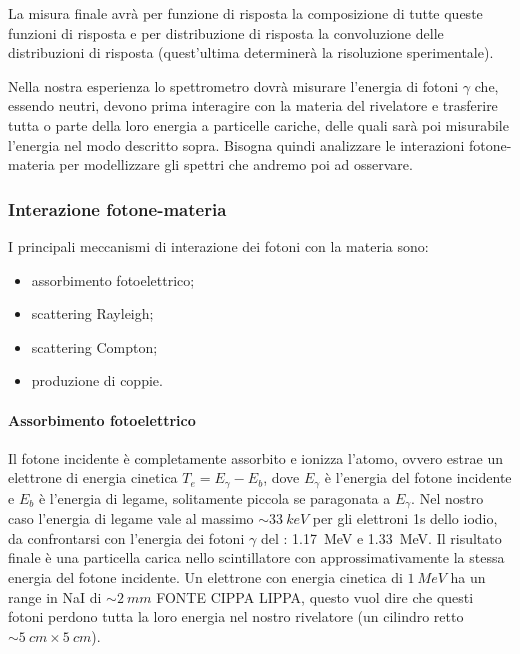 La misura finale avrà per funzione di risposta la composizione di tutte queste funzioni di risposta e per distribuzione di risposta la convoluzione delle distribuzioni di risposta (quest'ultima determinerà la risoluzione sperimentale).

Nella nostra esperienza lo spettrometro dovrà misurare l'energia di fotoni $\gamma$ che, essendo neutri, devono prima interagire con la materia del rivelatore e trasferire tutta o parte della loro energia a particelle cariche, delle quali sarà poi misurabile l'energia nel modo descritto sopra. Bisogna quindi analizzare le interazioni fotone-materia per modellizzare gli spettri che andremo poi ad osservare.

\subsubsection{Interazione fotone-materia}
I principali meccanismi di interazione dei fotoni con la materia sono:
\begin{itemize}
	\item assorbimento fotoelettrico;
	\item scattering Rayleigh;
	\item scattering Compton;
	\item produzione di coppie.
\end{itemize}
  
 \paragraph{Assorbimento fotoelettrico}
 Il fotone incidente è completamente assorbito e ionizza l'atomo, ovvero estrae un elettrone di energia cinetica $T_e = E_{\gamma} - E_b$, dove $E_{\gamma}$ è l'energia del fotone incidente e $E_b$ è l'energia di legame, solitamente piccola se paragonata a $E_{\gamma}$. Nel nostro caso l'energia di legame vale al massimo $\sim \SI{33}{keV}$ per gli elettroni 1s dello iodio, da confrontarsi con l'energia dei fotoni $\gamma$ del \co\;: \SI{1.17}{MeV} e \SI{1.33}{MeV}. Il risultato finale è una particella carica nello scintillatore con approssimativamente la stessa energia del fotone incidente.
 Un elettrone con energia cinetica di $\SI{1}{MeV}$ ha un range in NaI di $\sim \SI{2}{mm}$ FONTE CIPPA LIPPA, questo vuol dire che questi fotoni perdono tutta la loro energia nel nostro rivelatore (un cilindro retto $\sim \SI{5}{cm} \times \SI{5}{cm}$). 

